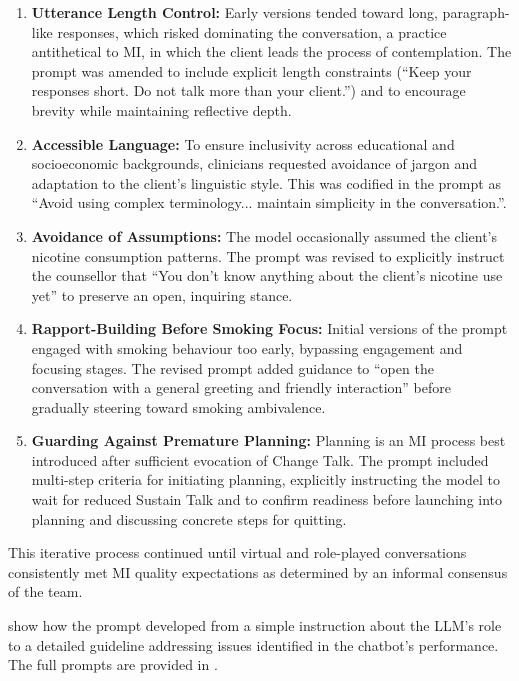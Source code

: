 \begin{enumerate}
	\item \textbf{Utterance Length Control:} Early versions tended toward long, paragraph-like responses, which risked dominating the conversation, a practice antithetical to MI, in which the client leads the process of contemplation. The prompt was amended to include explicit length constraints (``Keep your responses short. Do not talk more than your client.'') and to encourage brevity while maintaining reflective depth.

	\item \textbf{Accessible Language:} To ensure inclusivity across educational and socioeconomic backgrounds, clinicians requested avoidance of jargon and adaptation to the client's linguistic style. This was codified in the prompt as ``Avoid using complex terminology... maintain simplicity in the conversation.''.

	\item \textbf{Avoidance of Assumptions:} The model occasionally assumed the client's nicotine consumption patterns. The prompt was revised to explicitly instruct the counsellor that ``You don't know anything about the client's nicotine use yet'' to preserve an open, inquiring stance.

	\item \textbf{Rapport-Building Before Smoking Focus:} Initial versions of the prompt engaged with smoking behaviour too early, bypassing engagement and focusing stages. The revised prompt added guidance to ``open the conversation with a general greeting and friendly interaction'' before gradually steering toward smoking ambivalence.

	\item \textbf{Guarding Against Premature Planning:} Planning is an MI process best introduced after sufficient evocation of Change Talk. The prompt included multi-step criteria for initiating planning, explicitly instructing the model to wait for reduced Sustain Talk and to confirm readiness before launching into planning and discussing concrete steps for quitting.


\end{enumerate}



This iterative process continued until virtual and role-played conversations consistently met MI quality expectations as determined by an informal consensus of the team.


 show how the prompt developed from a simple instruction about the LLM's role to a detailed guideline addressing issues identified in the chatbot's performance. The full prompts are provided in .


